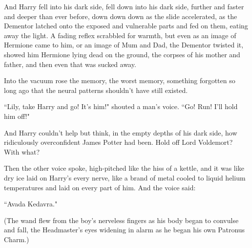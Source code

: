 And Harry fell into his dark side, fell down into his dark side, further and faster and deeper than ever before, down down down as the slide accelerated, as the Dementor latched onto the exposed and vulnerable parts and fed on them, eating away the light. A fading reflex scrabbled for warmth, but even as an image of Hermione came to him, or an image of Mum and Dad, the Dementor twisted it, showed him Hermione lying dead on the ground, the corpses of his mother and father, and then even that was sucked away.

Into the vacuum rose the memory, the worst memory, something forgotten so long ago that the neural patterns shouldn't have still existed.

\begin{em}
``Lily, take Harry and go! It's him!" shouted a man's voice. ``Go! Run! I'll hold him off!"

And Harry couldn't help but think, in the empty depths of his dark side, how ridiculously overconfident James Potter had been. Hold off Lord Voldemort? With what?

Then the other voice spoke, high-pitched like the hiss of a kettle, and it was like dry ice laid on Harry's every nerve, like a brand of metal cooled to liquid helium temperatures and laid on every part of him. And the voice said:

``Avada Kedavra."
\end{em}

(The wand flew from the boy's nerveless fingers as his body began to convulse and fall, the Headmaster's eyes widening in alarm as he began his own Patronus Charm.)

